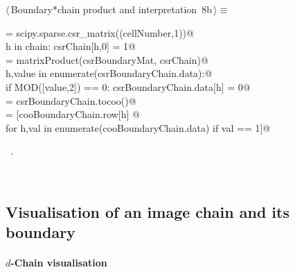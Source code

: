 \documentclass[11pt,oneside]{article}	%
\begin{document}
\begin{flushleft} \small
\begin{minipage}{\linewidth} \label{scrap13}
\protect{}$\langle\,$Boundary*chain product and interpretation\nobreak\ {\footnotesize 8b}$\,\rangle\equiv$
\vspace{-1ex}
\begin{list}{}{} \item
\mbox{}\verb@csrChain = scipy.sparse.csr_matrix((cellNumber,1))@\\
\mbox{}\verb@for h in chain: csrChain[h,0] = 1@\\
\mbox{}\verb@csrBoundaryChain = matrixProduct(csrBoundaryMat, csrChain)@\\
\mbox{}\verb@for h,value in enumerate(csrBoundaryChain.data):@\\
\mbox{}\verb@   if MOD([value,2]) == 0: csrBoundaryChain.data[h] = 0@\\
\mbox{}\verb@cooBoundaryChain = csrBoundaryChain.tocoo()@\\
\mbox{}\verb@boundaryCells = [cooBoundaryChain.row[h] @\\
\mbox{}\verb@   for h,val in enumerate(cooBoundaryChain.data) if val == 1]@\\
\mbox{}\verb@@{\NWsep}
\end{list}
\vspace{-1ex}
\footnotesize\addtolength{\baselineskip}{-1ex}
\begin{list}{}{\setlength{\itemsep}{-\parsep}\setlength{\itemindent}{-\leftmargin}}
\item \NWtxtMacroRefIn\ .
\end{list}
\end{minipage}\\[4ex]
\end{flushleft}


\subsection{Visualisation of an image chain and its boundary}


\paragraph{$d$-Chain visualisation}
\end{document}

